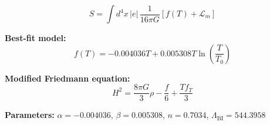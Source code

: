 
\begin{equation}
  S = \int d^4x \, |e| \, \frac{1}{16\pi G} \left[ f(T) + \mathcal{L}_m \right]
\end{equation}

\textbf{Best-fit model:}
\begin{equation}
  f(T) = -0.004036 T + 0.005308 T \ln\!\left(\frac{T}{T_0}\right)
\end{equation}

\textbf{Modified Friedmann equation:}
\begin{equation}
  H^2 = \frac{8\pi G}{3} \rho - \frac{f}{6} + \frac{T f_T}{3}
\end{equation}

\textbf{Parameters:}
$\alpha = -0.004036$, \quad
$\beta = 0.005308$, \quad
$n = 0.7034$, \quad
$\Lambda_{\text{BI}} = 544.3958$
